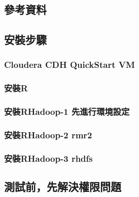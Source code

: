 \documentclass[
]{book}
\begin{document}
\hypertarget{ux53c3ux8003ux8cc7ux6599}{%
\subsection{參考資料}\label{ux53c3ux8003ux8cc7ux6599}}

\hypertarget{ux5b89ux88ddux6b65ux9a5f}{%
\subsection{安裝步驟}\label{ux5b89ux88ddux6b65ux9a5f}}

\hypertarget{cloudera-cdh-quickstart-vm}{%
\subsubsection{Cloudera CDH QuickStart VM}\label{cloudera-cdh-quickstart-vm}}

\hypertarget{ux5b89ux88ddr}{%
\subsubsection{安裝R}\label{ux5b89ux88ddr}}

\hypertarget{ux5b89ux88ddrhadoop-1-ux5148ux9032ux884cux74b0ux5883ux8a2dux5b9a}{%
\subsubsection{安裝RHadoop-1 先進行環境設定}\label{ux5b89ux88ddrhadoop-1-ux5148ux9032ux884cux74b0ux5883ux8a2dux5b9a}}

\hypertarget{ux5b89ux88ddrhadoop-2-rmr2}{%
\subsubsection{安裝RHadoop-2 rmr2}\label{ux5b89ux88ddrhadoop-2-rmr2}}

\hypertarget{ux5b89ux88ddrhadoop-3-rhdfs}{%
\subsubsection{安裝RHadoop-3 rhdfs}\label{ux5b89ux88ddrhadoop-3-rhdfs}}

\hypertarget{ux6e2cux8a66ux524dux5148ux89e3ux6c7aux6b0aux9650ux554fux984c}{%
\subsection{測試前，先解決權限問題}\label{ux6e2cux8a66ux524dux5148ux89e3ux6c7aux6b0aux9650ux554fux984c}}
\end{document}

